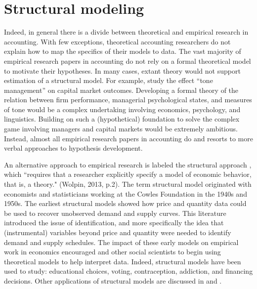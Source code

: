 \section{Structural modeling}
Indeed, in general there is a divide between theoretical and empirical research in accounting.
With few exceptions, theoretical accounting researchers do not explain how to map the specifics of their models to data. 
The vast majority of empirical research papers in accounting do not rely on a formal theoretical model to motivate their hypotheses.
In many cases, extant theory would not support estimation of a structural model.
For example, \citet{Huang:2014cs} study the effect ``tone management'' on capital market outcomes. 
Developing a formal theory of the relation between firm performance, managerial psychological states, and measures of tone would be a complex undertaking involving economics, psychology, and linguistics.
Building on such a (hypothetical) foundation to solve the complex game involving managers and capital markets would be extremely ambitious.
Instead, almost all empirical research papers in accounting do and resorts to more verbal approaches to hypothesis development. 

An alternative approach to empirical research is labeled the structural approach \citep{Wolpin:2013bl}, which 
 ``requires that a researcher explicitly specify a model of economic behavior, that is, a theory." (Wolpin, 2013, p.2).
The term structural model originated with economists and statisticians working at the Cowles Foundation in the 1940s and 1950s.
The earliest structural models showed how price and quantity data could be used to recover unobserved demand and supply curves. 
This literature introduced the issue of identification, and more specifically the idea that (instrumental) variables beyond price and quantity were needed to identify demand and supply schedules. 
The impact of these early models on empirical work in economics encouraged and other social scientists to begin using theoretical models to help interpret data.
Indeed, structural models have been used to study: educational choices, voting, contraception, addiction, and financing decisions. 
Other applications of structural models are discussed in \citet{Reiss:2007ej} and \citet{Reiss:2011go}.

